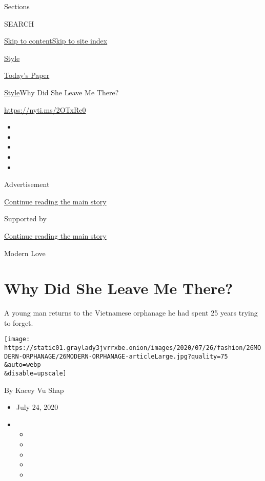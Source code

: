 Sections

SEARCH

\protect\hyperlink{site-content}{Skip to
content}\protect\hyperlink{site-index}{Skip to site index}

\href{https://www.nytimes3xbfgragh.onion/section/style}{Style}

\href{https://myaccount.nytimes3xbfgragh.onion/auth/login?response_type=cookie\&client_id=vi}{}

\href{https://www.nytimes3xbfgragh.onion/section/todayspaper}{Today's
Paper}

\href{/section/style}{Style}\textbar{}Why Did She Leave Me There?

\href{https://nyti.ms/2OTxRe0}{https://nyti.ms/2OTxRe0}

\begin{itemize}
\item
\item
\item
\item
\item
\end{itemize}

Advertisement

\protect\hyperlink{after-top}{Continue reading the main story}

Supported by

\protect\hyperlink{after-sponsor}{Continue reading the main story}

Modern Love

\hypertarget{why-did-she-leave-me-there}{%
\section{Why Did She Leave Me There?}\label{why-did-she-leave-me-there}}

A young man returns to the Vietnamese orphanage he had spent 25 years
trying to forget.

\texttt{[image: https://static01.graylady3jvrrxbe.onion/images/2020/07/26/fashion/26MODERN-ORPHANAGE/26MODERN-ORPHANAGE-articleLarge.jpg?quality=75\\\&auto=webp\\\&disable=upscale]}

By Kacey Vu Shap

\begin{itemize}
\item
  July 24, 2020
\item
  \begin{itemize}
  \item
  \item
  \item
  \item
  \item
  \end{itemize}
\end{itemize}

